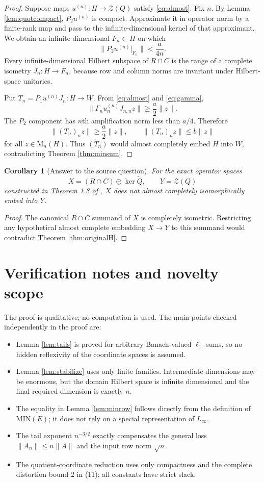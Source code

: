 \documentclass[11pt]{article}
\newtheorem{corollary}[theorem]{Corollary}
\newcommand{\MIN}{\mathrm{MIN}}
\newcommand{\cZ}{\mathcal Z}
\newcommand{\M}{\mathrm M}
\begin{document}
\begin{proof}
Suppose maps $u^{(n)}:H\to\cZ(Q)$ satisfy \eqref{eq:almost}.  Fix $n$.
By Lemma \ref{lem:quotcompact}, $P_2u^{(n)}$ is compact.  Approximate it in
operator norm by a finite-rank map and pass to the infinite-dimensional
kernel of that approximant.  We obtain an infinite-dimensional $F_n\subset H$
on which
\[
 \|P_2u^{(n)}|_{F_n}\|<\frac{a}{4n}.
\]
Every infinite-dimensional Hilbert subspace of $R\cap C$ is the range of a
complete isometry $J_n:H\to F_n$, because row and column norms are invariant
under Hilbert-space unitaries.

Put $T_n=P_1u^{(n)}J_n:H\to W$.  From \eqref{eq:almost} and
\eqref{eq:gamma},
\[
 \|\Gamma_nu^{(n)}_nJ_{n,n}z\|\geq\frac a2\|z\|.
\]
The $P_2$ component has $n$th amplification norm less than $a/4$.  Therefore
\[
 \|(T_n)_nz\|\geq\frac a2\|z\|,
 \qquad
 \|(T_n)_nz\|\leq b\|z\|
\]
for all $z\in\M_n(H)$.  Thus $(T_n)$ would almost completely embed $H$ into
$W$, contradicting Theorem \ref{thm:minsum}.
\end{proof}

\begin{corollary}[Answer to the source question]\label{cor:answer}
For the exact operator spaces
\[
 X=(R\cap C)\oplus\ker\widetilde Q,
 \qquad Y=\cZ(Q)
\]
constructed in Theorem 1.8 of \cite{Braga2021}, $X$ does not almost
completely isomorphically embed into $Y$.
\end{corollary}

\begin{proof}
The canonical $R\cap C$ summand of $X$ is completely isometric.  Restricting
any hypothetical almost complete embedding $X\to Y$ to this summand would
contradict Theorem \ref{thm:originalH}.
\end{proof}

\section{Verification notes and novelty scope}

The proof is qualitative; no computation is used.  The main points checked
independently in the proof are:
\begin{itemize}
\item Lemma \ref{lem:tails} is proved for arbitrary Banach-valued $\ell_1$
sums, so no hidden reflexivity of the coordinate spaces is assumed.
\item Lemma \ref{lem:stabilize} uses only finite families.  Intermediate
dimensions may be enormous, but the domain Hilbert space is infinite
dimensional and the final required dimension is exactly $n$.
\item The equality in Lemma \ref{lem:minrow} follows directly from the
definition of $\MIN(E)$; it does not rely on a special representation of
$L_\infty$.
\item The tail exponent $n^{-3/2}$ exactly compensates the general loss
$\|A_n\|\leq n\|A\|$ and the input row norm $\sqrt n$.
\item The quotient-coordinate reduction uses only compactness and the
complete distortion bound $2$ in (11); all constants have strict slack.
\end{itemize}
\end{document}
